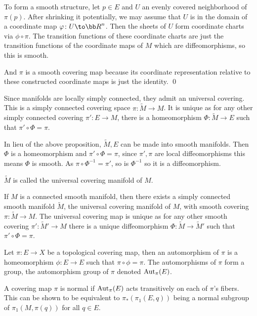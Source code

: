     To form a smooth structure, let $p\in E$ and $U$ an evenly covered neighborhood of $\pi(p)$.
    After shrinking it potentially, we may assume that $U$ is in the domain of a coordinate map $\phi\colon U\to\bR^n$.
    Then the sheets of $U$ form coordinate charts via $\phi\circ\pi$.
    The transition functions of these coordinate charts are just the transition functions of the coordinate maps of $M$
    which are diffeomorphisms, so this is smooth.

    And $\pi$ is a smooth covering map because its coordinate representation relative to these constructed coordinate maps
    is just the identity.
    \qed

\eproof

Since manifolds are locally simply connected, they admit an {\emphcolor universal covering}.
This is a simply connected covering space $\pi\colon\tilde M\to M$.
It is unique as for any other simply connected covering $\pi'\colon E\to M$, there is a homeomorphism $\Phi\colon\tilde M\to E$
such that $\pi'\circ\Phi=\pi$.

In lieu of the above proposition, $\tilde M,E$ can be made into smooth manifolds.
Then $\Phi$ is a homeomorphism and $\pi'\circ\Phi=\pi$, since $\pi',\pi$ are local diffeomorphisms this means $\Phi$
is smooth.
As $\pi\circ\Phi^{-1}=\pi'$, so is $\Phi^{-1}$ so it is a diffeomorphism.

$\tilde M$ is called the {\emphcolor universal covering manifold} of $M$.

\bcoro

    If $M$ is a connected smooth manifold, then there exists a simply connected smooth manifold $\tilde M$, the
    {\emphcolor universal covering manifold} of $M$, with smooth covering $\pi\colon\tilde M\to M$.
    The universal covering map is unique as for any other smooth covering $\pi'\colon\tilde M'\to M$ there is a unique
    diffeomorphism $\Phi\colon\tilde M\to\tilde M'$ such that $\pi'\circ\Phi=\pi$.

\ecoro

\bdefn

    Let $\pi\colon E\to X$ be a topological covering map, then an {\emphcolor automorphism} of $\pi$
    is a homeomorphism $\phi\colon E\to E$ such that $\pi\circ\phi=\pi$.
    The automorphisms of $\pi$ form a group, the {\emphcolor automorphism group} of $\pi$ denoted ${\rm Aut}_\pi(E)$.

    A covering map $\pi$ is {\emphcolor normal} if ${\rm Aut}_\pi(E)$ acts transitively on each of $\pi$'s fibers.
    This can be shown to be equivalent to $\pi_*(\pi_1(E,q))$ being a normal subgroup of $\pi_1(M,\pi(q))$ for all
    $q\in E$.

